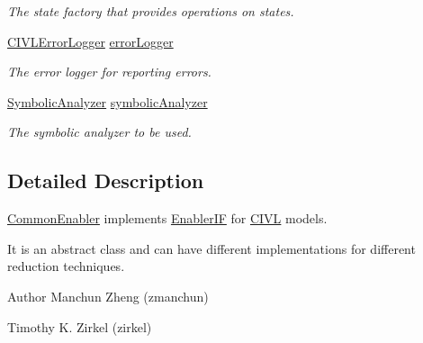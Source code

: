 \begin{DoxyCompactItemize}
\begin{DoxyCompactList}\small\item\em The state factory that provides operations on states. \end{DoxyCompactList}\item 
\hypertarget{classedu_1_1udel_1_1cis_1_1vsl_1_1civl_1_1kripke_1_1common_1_1CommonEnabler_af13cf4d908776faff26025c88e9f7f6e}{}\hyperlink{classedu_1_1udel_1_1cis_1_1vsl_1_1civl_1_1log_1_1IF_1_1CIVLErrorLogger}{C\+I\+V\+L\+Error\+Logger} \hyperlink{classedu_1_1udel_1_1cis_1_1vsl_1_1civl_1_1kripke_1_1common_1_1CommonEnabler_af13cf4d908776faff26025c88e9f7f6e}{error\+Logger}\label{classedu_1_1udel_1_1cis_1_1vsl_1_1civl_1_1kripke_1_1common_1_1CommonEnabler_af13cf4d908776faff26025c88e9f7f6e}

\begin{DoxyCompactList}\small\item\em The error logger for reporting errors. \end{DoxyCompactList}\item 
\hypertarget{classedu_1_1udel_1_1cis_1_1vsl_1_1civl_1_1kripke_1_1common_1_1CommonEnabler_a7fe830b682c6ef46defd766ebf14c66b}{}\hyperlink{interfaceedu_1_1udel_1_1cis_1_1vsl_1_1civl_1_1semantics_1_1IF_1_1SymbolicAnalyzer}{Symbolic\+Analyzer} \hyperlink{classedu_1_1udel_1_1cis_1_1vsl_1_1civl_1_1kripke_1_1common_1_1CommonEnabler_a7fe830b682c6ef46defd766ebf14c66b}{symbolic\+Analyzer}\label{classedu_1_1udel_1_1cis_1_1vsl_1_1civl_1_1kripke_1_1common_1_1CommonEnabler_a7fe830b682c6ef46defd766ebf14c66b}

\begin{DoxyCompactList}\small\item\em The symbolic analyzer to be used. \end{DoxyCompactList}\end{DoxyCompactItemize}


\subsection{Detailed Description}
\hyperlink{classedu_1_1udel_1_1cis_1_1vsl_1_1civl_1_1kripke_1_1common_1_1CommonEnabler}{Common\+Enabler} implements \hyperlink{}{Enabler\+I\+F} for \hyperlink{classedu_1_1udel_1_1cis_1_1vsl_1_1civl_1_1CIVL}{C\+I\+V\+L} models. 

It is an abstract class and can have different implementations for different reduction techniques.

\begin{DoxyAuthor}{Author}
Manchun Zheng (zmanchun) 

Timothy K. Zirkel (zirkel) 
\end{DoxyAuthor}


